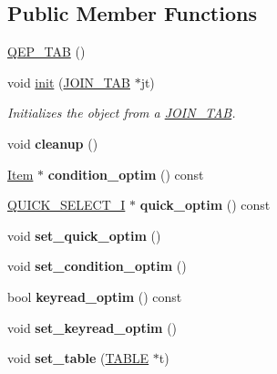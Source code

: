 \subsection*{Public Member Functions}
\begin{DoxyCompactItemize}
\item 
\mbox{\hyperlink{classQEP__TAB_a8d6de370a4036642fa57cd2554f8758b}{Q\+E\+P\+\_\+\+T\+AB}} ()
\item 
void \mbox{\hyperlink{group__Query__Optimizer_ga31a07bf891c57c62aad090896e118cd1}{init}} (\mbox{\hyperlink{classJOIN__TAB}{J\+O\+I\+N\+\_\+\+T\+AB}} $\ast$jt)
\begin{DoxyCompactList}\small\item\em Initializes the object from a \mbox{\hyperlink{classJOIN__TAB}{J\+O\+I\+N\+\_\+\+T\+AB}}. \end{DoxyCompactList}\item 
void {\bfseries cleanup} ()
\item 
\mbox{\label{classQEP__TAB_a246b4a07aca9216c084ff43ffdac2f32}} 
\mbox{\hyperlink{classItem}{Item}} $\ast$ {\bfseries condition\+\_\+optim} () const
\item 
\mbox{\label{classQEP__TAB_a77f7567094ff06daf2cd6a9ef6648811}} 
\mbox{\hyperlink{classQUICK__SELECT__I}{Q\+U\+I\+C\+K\+\_\+\+S\+E\+L\+E\+C\+T\+\_\+I}} $\ast$ {\bfseries quick\+\_\+optim} () const
\item 
\mbox{\label{classQEP__TAB_a4a834202a47ab7891c5f25d152443d14}} 
void {\bfseries set\+\_\+quick\+\_\+optim} ()
\item 
\mbox{\label{classQEP__TAB_ab496b635e277fb3a6eda357250191c86}} 
void {\bfseries set\+\_\+condition\+\_\+optim} ()
\item 
\mbox{\label{classQEP__TAB_a44d162efd8a3e913dabbd8c8d3e1e167}} 
bool {\bfseries keyread\+\_\+optim} () const
\item 
\mbox{\label{classQEP__TAB_afd71e4cfade57b24a83c542ff4cff06c}} 
void {\bfseries set\+\_\+keyread\+\_\+optim} ()
\item 
\mbox{\label{classQEP__TAB_a5db454537eee9950c7c2e6bdc4899195}} 
void {\bfseries set\+\_\+table} (\mbox{\hyperlink{structTABLE}{T\+A\+B\+LE}} $\ast$t)

\end{DoxyCompactItemize}
